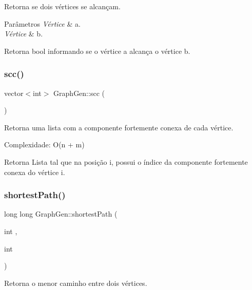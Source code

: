 Retorna se dois vértices se alcançam. 
\begin{DoxyParams}{Parâmetros}
{\em Vértice} & a. \\
\hline
{\em Vértice} & b. \\
\hline
\end{DoxyParams}
\begin{DoxyReturn}{Retorna}
bool informando se o vértice \textquotesingle{}a\textquotesingle{} alcança o vértice \textquotesingle{}b\textquotesingle{}. 
\end{DoxyReturn}
\mbox{\label{classGraphGen_a875733956a1f667d68afb420f53ecc86}} 
\subsubsection{\texorpdfstring{scc()}{scc()}}
{\footnotesize\ttfamily vector$<$int$>$ Graph\+Gen\+::scc (\begin{DoxyParamCaption}{ }\end{DoxyParamCaption})}

Retorna uma lista com a componente fortemente conexa de cada vértice.

Complexidade\+: O(n + m) \begin{DoxyReturn}{Retorna}
Lista tal que na posição \textquotesingle{}i\textquotesingle{}, possui o índice da componente fortemente conexa do vértice \textquotesingle{}i\textquotesingle{}. 
\end{DoxyReturn}
\mbox{\label{classGraphGen_ad42fcde82e163baadcfaa02293242db5}} 
\subsubsection{\texorpdfstring{shortestPath()}{shortestPath()}}
{\footnotesize\ttfamily long long Graph\+Gen\+::shortest\+Path (\begin{DoxyParamCaption}\item[{int}]{,  }\item[{int}]{ }\end{DoxyParamCaption})}

Retorna o menor caminho entre dois vértices.

